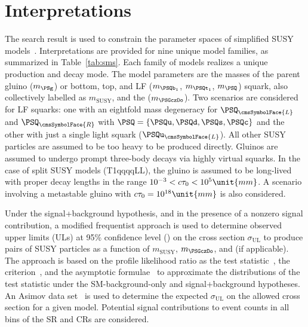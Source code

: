 \section{Interpretations}
\label{sec:interpretations}

The search result is used to constrain the parameter spaces of
simplified SUSY models~\cite{Alwall:2008ag, Alwall:2008va,
  sms}. Interpretations are provided for nine unique model families,
as summarized in Table~\ref{tab:sms}. Each family of models realizes a
unique production and decay mode. The model parameters are the masses
of the parent gluino ($m_\PSg$) or bottom, top, and LF ($m_{\PSQb_1}$,
$m_{\PSQt_1}$, $m_{\PSQ}$) squark, also collectively labelled as
$m_\text{SUSY}$, and the \PSGczDo ($m_{\PSGczDo}$). Two scenarios are
considered for LF squarks: one with an eightfold mass degeneracy for
$\PSQ_\cmsSymbolFace{L}$ and $\PSQ_\cmsSymbolFace{R}$ with $\PSQ =
\{\PSQu, \PSQd, \PSQs, \PSQc\}$ and the other with just a single light
squark ($\PSQu_\cmsSymbolFace{L}$). All other SUSY particles are
assumed to be too heavy to be produced directly. Gluinos are assumed
to undergo prompt three-body decays via highly virtual squarks. In the
case of split SUSY models (T1qqqqLL), the gluino is assumed to be
long-lived with proper decay lengths in the range $10^{-3} < \ctau <
10^{5}\unit{mm}$. A scenario involving a metastable gluino with $\ctau
= 10^{18}\unit{mm}$ is also considered.

Under the signal+background hypothesis, and in the presence of a
nonzero signal contribution, a modified frequentist approach is used
to determine observed upper limits (ULs) at 95\% confidence level (\CL)
on the cross section $\sigma_\text{UL}$ to produce pairs of SUSY
particles as a function of $m_\text{SUSY}$, $m_{\PSGczDo}$, and \ctau
(if applicable). The approach is based on the profile likelihood ratio
as the test statistic~\cite{CMS-NOTE-2011-005}, the \cls
criterion~\cite{junk, read}, and the asymptotic
formulae~\cite{Cowan:2010js} to approximate the distributions of the
test statistic under the SM-background-only and signal+background
hypotheses.  An Asimov data set~\cite{Cowan:2010js} is used to
determine the expected $\sigma_\text{UL}$ on the allowed cross section
for a given model. Potential signal contributions to event counts in
all bins of the SR and CRs are considered.

